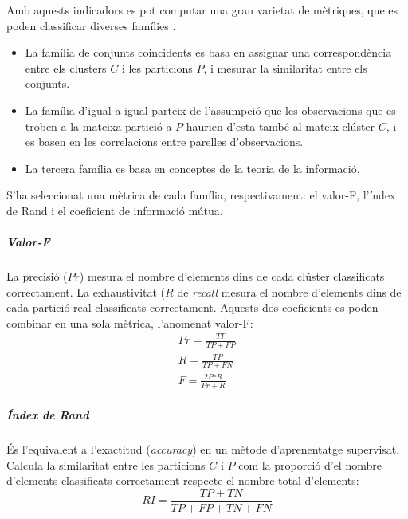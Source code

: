 \documentclass[CAT,BIB]{TFUOC}%
\begin{document}
            Amb aquests indicadors
            es pot computar una gran varietat de mètriques,
            que es poden classificar diverses famílies \citep{Palacio-Nino2019}.
            \begin{itemize}
                \item La família de conjunts coincidents
                es basa en assignar una correspondència
                entre els clusters $C$ i les particions $P$,
                i mesurar la similaritat entre els conjunts.

                \item La família d'igual a igual parteix de l'assumpció
                que les observacions que es troben a la mateixa partició a $P$
                haurien d'esta també al mateix clúster $C$,
                i es basen en les correlacions entre parelles d'observacions.

                \item La tercera família es basa
                en conceptes de la teoria de la informació.
            \end{itemize}


            S'ha seleccionat una mètrica de cada família, respectivament:
            el valor-F,
            l'índex de Rand
            i el coeficient de informació mútua.

            \subparagraph{Valor-F}
                La precisió ($Pr$) mesura
                el nombre d'elements dins de cada clúster classificats correctament.
                La exhaustivitat ($R$ de \textit{recall} mesura
                el nombre d'elements dins de cada partició real classificats correctament.
                Aquests dos coeficients es poden combinar
                en una sola mètrica, l'anomenat valor-F:
                \begin{gather}
                \label{eq:precision}
                    Pr = \frac{TP}{TP + FP}
                \\
                \label{eq:recall}
                    R = \frac{TP}{TP + FN}
                \\
                \label{eq:f_measure}
                    F = \frac{2 Pr R}{Pr + R}
                \end{gather}

            \subparagraph{Índex de Rand}
                És l'equivalent a l'exactitud (\textit{accuracy})
                en un mètode d'aprenentatge supervisat.
                Calcula la similaritat entre les particions $C$ i $P$
                com la proporció d'el nombre d'elements classificats correctament
                respecte el nombre total d'elements:
                \begin{equation}
                \label{eq:rand}
                    RI = \frac{TP + TN}{TP + FP + TN + FN}
                \end{equation}
\end{document}
